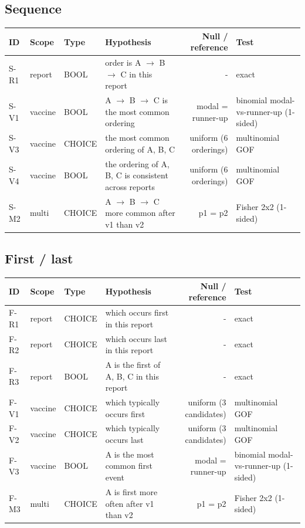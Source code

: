 \documentclass[11pt]{article}
\begin{document}
\subsection*{Sequence}
\noindent\begin{tabularx}{\linewidth}{lllWNT}
\toprule
\textbf{ID} & \textbf{Scope} & \textbf{Type} & \textbf{Hypothesis} & \textbf{Null / reference} & \textbf{Test} \\
\midrule
S-R1 & report & BOOL & order is A $\rightarrow$  B $\rightarrow$  C in this report & - & exact \\
S-V1 & vaccine & BOOL & A $\rightarrow$  B $\rightarrow$  C is the most common ordering & modal = runner-up & binomial modal-vs-runner-up (1-sided) \\
S-V3 & vaccine & CHOICE & the most common ordering of A, B, C & uniform (6 orderings) & multinomial GOF \\
S-V4 & vaccine & BOOL & the ordering of A, B, C is consistent across reports & uniform (6 orderings) & multinomial GOF \\
S-M2 & multi & CHOICE & A $\rightarrow$  B $\rightarrow$  C more common after v1 than v2 & p1 = p2 & Fisher 2x2 (1-sided) \\
\bottomrule
\end{tabularx}
\subsection*{First / last}
\noindent\begin{tabularx}{\linewidth}{lllWNT}
\toprule
\textbf{ID} & \textbf{Scope} & \textbf{Type} & \textbf{Hypothesis} & \textbf{Null / reference} & \textbf{Test} \\
\midrule
F-R1 & report & CHOICE & which occurs first in this report & - & exact \\
F-R2 & report & CHOICE & which occurs last in this report & - & exact \\
F-R3 & report & BOOL & A is the first of A, B, C in this report & - & exact \\
F-V1 & vaccine & CHOICE & which typically occurs first & uniform (3 candidates) & multinomial GOF \\
F-V2 & vaccine & CHOICE & which typically occurs last & uniform (3 candidates) & multinomial GOF \\
F-V3 & vaccine & BOOL & A is the most common first event & modal = runner-up & binomial modal-vs-runner-up (1-sided) \\
F-M3 & multi & CHOICE & A is first more often after v1 than v2 & p1 = p2 & Fisher 2x2 (1-sided) \\
\bottomrule
\end{tabularx}
\end{document}
